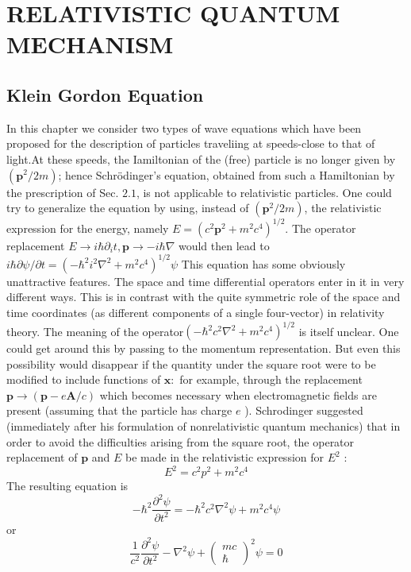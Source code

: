 \chapter{RELATIVISTIC QUANTUM MECHANISM}
\section{Klein Gordon Equation}
In this chapter we consider two types of wave equations which have been proposed for the description of particles traveliing at speeds-close to that of light.At these speeds, the Iamiltonian of the (free) particle is no longer given by $\left(\mathbf{p}^{2} / 2 m\right)$; hence Schrödinger's equation, obtained from such a Hamiltonian by the prescription of Sec. $2.1$, is not applicable to relativistic particles. One could try to generalize the equation by using, instead of $\left(\mathbf{p}^{2} / 2 m\right)$, the relativistic expression for the energy, namely $E=\left(c^{2} \mathbf{p}^{2}+m^{2} c^{4}\right)^{1 / 2}$. The operator replacement $E \rightarrow i \hbar \partial_{i} t, \mathbf{p} \rightarrow-i \hbar \nabla$ would then lead to $i \hbar \partial \psi / \partial t=\left(-\hbar^{2} i^{2} \nabla^{2}+m^{2} c^{4}\right)^{1 / 2} \psi$ This equation has some obviously unattractive features. The space and time differential operators enter in it in very different ways. This is in contrast with the quite symmetric role of the space and time coordinates (as different components of a single four-vector) in relativity theory. The meaning of the operator$\left(-\hbar^{2} c^{2} \nabla^{2}+m^{2} c^{4}\right)^{1 / 2}$ is itself unclear. One could get around this by passing to the momentum representation. But even this possibility would disappear if the quantity under the square root were to be modified to include functions of $\mathbf{x}:$ for example, through the replacement $\mathbf{p} \rightarrow(\mathbf{p}-e \mathbf{A} / c)$ which becomes necessary when electromagnetic fields are present (assuming that the particle has charge $e$ ). Schrodinger suggested (immediately after his formulation of nonrelativistic quantum mechanics) that in order to avoid the difficulties arising from the square root, the operator replacement of $\mathbf{p}$ and $E$ be made in the relativistic expression for $E^{2}$ :
$$
E^{2}=c^{2} p^{2}+m^{2} c^{4}
$$
The resulting equation is
$$
-\hbar^{2} \frac{\partial^{2} \psi}{\partial t^{2}}=-\hbar^{2} c^{2} \nabla^{2} \psi+m^{2} c^{4} \psi
$$
or
$$
\frac{1}{c^{2}} \frac{\partial^{2} \psi}{\partial t^{2}}-\nabla^{2} \psi+\left(\begin{array}{c}
m c \\
\hbar
\end{array}\right)^{2} \psi=0
$$
